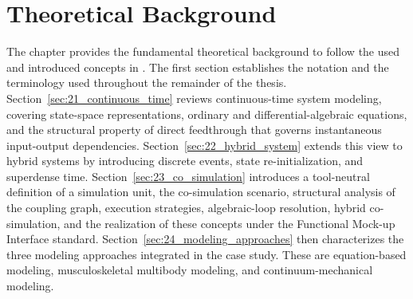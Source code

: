 \chapter{Theoretical Background}
\label{chap:theoretical_background}

The chapter provides the fundamental theoretical background to follow the used and introduced concepts in \syssimx{}.
The first section establishes the notation and the terminology used throughout the remainder of the thesis.
Section~\ref{sec:21_continuous_time} reviews continuous-time system modeling, covering state-space representations, ordinary and differential-algebraic equations, and the structural property of direct feedthrough that governs instantaneous input-output dependencies.
Section~\ref{sec:22_hybrid_system} extends this view to hybrid systems by introducing discrete events, state re-initialization, and superdense time.
Section~\ref{sec:23_co_simulation} introduces a tool-neutral definition of a simulation unit, the co-simulation scenario, structural analysis of the coupling graph, execution strategies, algebraic-loop resolution, hybrid co-simulation,
and the realization of these concepts under the Functional Mock-up Interface standard.
Section~\ref{sec:24_modeling_approaches} then characterizes the three modeling approaches integrated in the case study.
These are equation-based modeling, musculoskeletal multibody modeling, and continuum-mechanical modeling.





